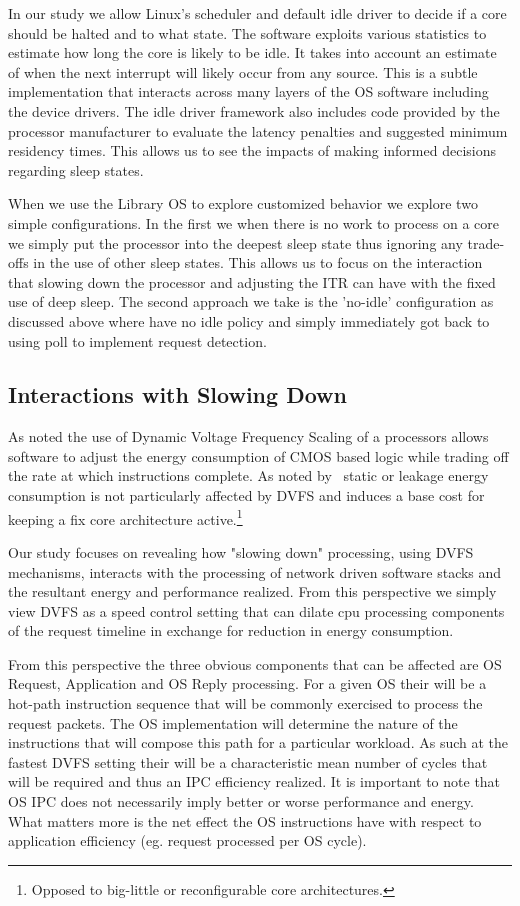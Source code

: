 In our study we allow Linux's scheduler and default idle driver to decide if a core should be halted and to what state.  The software exploits various statistics to estimate how long the core is likely to be idle. It takes into account an estimate of when the next interrupt will likely occur from any source.  This is a subtle implementation that interacts across many layers of the OS software including the device drivers.  The idle driver framework also includes code provided by the processor manufacturer to evaluate the latency penalties and suggested minimum residency times.  This allows us to see the impacts of making informed decisions regarding sleep states.  

When we use the Library OS to explore customized behavior we explore two simple configurations.  In the first we when there is no work to process on a core we simply put the processor into the deepest sleep state thus ignoring any trade-offs in the use of other sleep states.   This allows us to focus on the interaction that slowing down the processor and adjusting the ITR can have with the fixed use of deep sleep.   The second approach we take is the 'no-idle' configuration as discussed above where have no idle policy and simply immediately got back to using poll to implement request detection.

\subsection{Interactions with Slowing Down}
\label{sec:workflow:dvfs}

As noted the use of Dynamic Voltage Frequency Scaling of a processors allows software to adjust the energy consumption of CMOS based logic while trading off the rate at which instructions complete.  As noted by~\cite{slowdownorsleep, 10.1109/40.888701, pacingtoidle, udpm} static or leakage energy consumption is not particularly affected by DVFS and induces a base cost for keeping a fix core architecture active.\footnote{Opposed to big-little or reconfigurable core architectures.}

Our study focuses on revealing how "slowing down" processing, using DVFS mechanisms, interacts with the processing of network driven software stacks and the resultant energy and performance realized. From this perspective we simply view DVFS as a speed control setting that can dilate cpu processing components of the request timeline in exchange for reduction in energy consumption.

From this perspective the three obvious components that can be affected are OS Request, Application and OS Reply processing. For a given OS their will be a hot-path instruction sequence that will be commonly exercised to process the request packets.  The OS implementation will determine the nature of the instructions that will compose this path for a particular workload.  As such at the fastest DVFS setting their will be a characteristic mean number of cycles that will be required and thus an IPC efficiency realized.  It is important to note that OS IPC does not necessarily imply better or worse performance and energy. What matters more is the net effect the OS instructions have with respect to application efficiency (eg. request processed per OS cycle). 

